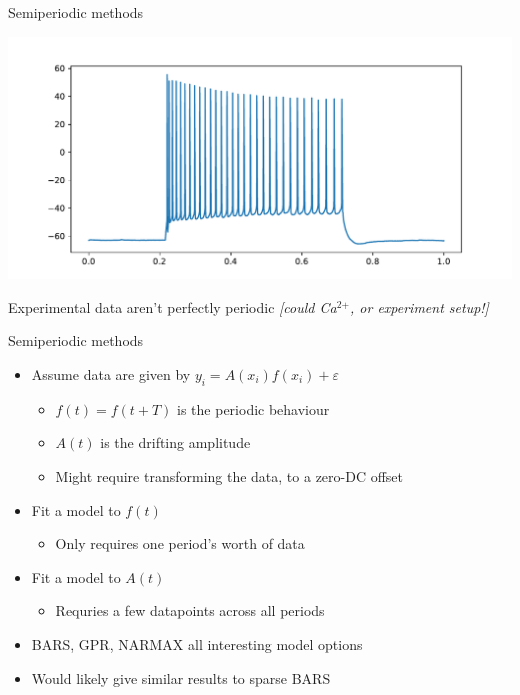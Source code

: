 \documentclass[presentation]{beamer}
\begin{document}
\begin{frame}[label={sec:orged36cfb}]{Semiperiodic methods}
\begin{center}
\includegraphics[width=.9\linewidth]{./mouseaperiodic.pdf}
\end{center}
Experimental data aren't perfectly periodic \emph{[could Ca\(^{\text{2+}}\), or experiment setup!]}
\end{frame}

\begin{frame}[label={sec:orgf80fb6b}]{Semiperiodic methods}
\begin{itemize}[<+->]
\item Assume data are given by \(y_i = A(x_i)f(x_i) + \varepsilon\)
\begin{itemize}
\item \(f(t) = f(t+T)\) is the periodic behaviour
\item \(A(t)\) is the drifting amplitude
\item Might require transforming the data, to a zero-DC offset
\end{itemize}
\item Fit a model to \(f(t)\)
\begin{itemize}
\item Only requires one period's worth of data
\end{itemize}
\item Fit a model to \(A(t)\)
\begin{itemize}
\item Requries a few datapoints across all periods
\end{itemize}
\item BARS, GPR, NARMAX all interesting model options
\item Would likely give similar results to sparse BARS
\end{itemize}
\end{frame}
\end{document}
